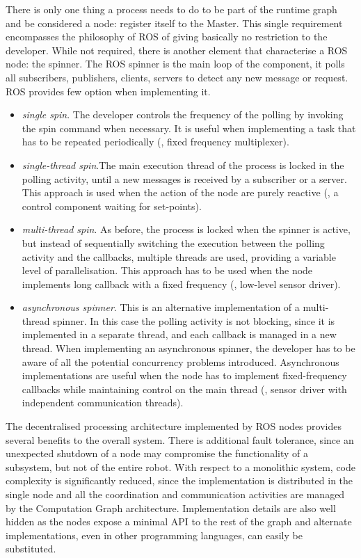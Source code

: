 There is only one thing a process needs to do to be part of the runtime graph and be considered a node: register itself to the Master. This single requirement encompasses the philosophy of ROS of giving basically no restriction to the developer. While not required, there is another element that characterise a ROS node: the spinner. The ROS spinner is the main loop of the component, it polls all subscribers, publishers, clients, servers to detect any new message or request. ROS provides few option when implementing it.
\begin{itemize}
\item \textit{single spin}. The developer controls the frequency of the polling by invoking the spin command when necessary. It is useful when implementing a task that has to be repeated periodically (\eg, fixed frequency multiplexer).
\item \textit{single-thread spin}.The main execution thread of the process is locked in the polling activity, until a new messages is received by a subscriber or a server. This approach is used when the action of the node are purely reactive (\eg, a control component waiting for set-points).
\item \textit{multi-thread spin}. As before, the process is locked when the spinner is active, but instead of sequentially switching the execution between the polling activity and the callbacks, multiple threads are used, providing a variable level of parallelisation. This approach has to be used when the node implements long callback with a fixed frequency (\eg, low-level sensor driver).
\item \textit{asynchronous spinner}. This is an alternative implementation of a multi-thread spinner. In this case the polling activity is not blocking, since it is implemented in a separate thread, and each callback is managed in a new thread. When implementing an asynchronous spinner, the developer has to be aware of all the potential concurrency problems introduced. Asynchronous implementations are useful when the node has to implement fixed-frequency callbacks while maintaining control on the main thread (\eg, sensor driver with independent communication threads).
\end{itemize}

The decentralised processing architecture implemented by ROS nodes provides several benefits to the overall system. There is additional fault tolerance, since an unexpected shutdown of a node may compromise the functionality of a subsystem, but not of the entire robot. With respect to a monolithic system, code complexity is significantly reduced, since the implementation is distributed in the single node and all the coordination and communication activities are managed by the Computation Graph architecture. Implementation details are also well hidden as the nodes expose a minimal API to the rest of the graph and alternate implementations, even in other programming languages, can easily be substituted.

